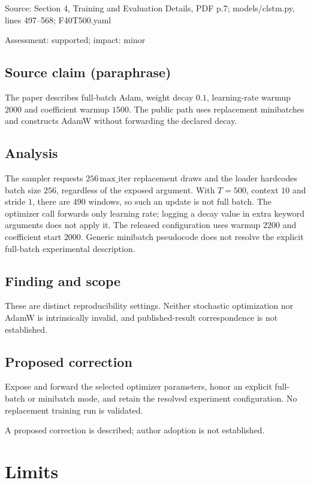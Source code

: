 \documentclass[11pt]{article}
\begin{document}
Source: Section 4, Training and Evaluation Details, PDF p.7; models/clstm.py, lines 497–568; F40T500.yaml

Assessment: supported; impact: minor

\subsection*{Source claim (paraphrase)}

The paper describes full-batch Adam, weight decay \(0.1\), learning-rate warmup \(2000\) and coefficient warmup \(1500\). The public path uses replacement minibatches and constructs AdamW without forwarding the declared decay.

\subsection*{Analysis}

The sampler requests \(256\,\mathrm{max\_iter}\) replacement draws and the loader hardcodes batch size \(256\), regardless of the exposed argument. With \(T=500\), context \(10\) and stride \(1\), there are \(490\) windows, so such an update is not full batch. The optimizer call forwards only learning rate; logging a decay value in extra keyword arguments does not apply it. The released configuration uses warmup \(2200\) and coefficient start \(2000\). Generic minibatch pseudocode does not resolve the explicit full-batch experimental description.

\subsection*{Finding and scope}

These are distinct reproducibility settings. Neither stochastic optimization nor AdamW is intrinsically invalid, and published-result correspondence is not established.

\subsection*{Proposed correction}

Expose and forward the selected optimizer parameters, honor an explicit full-batch or minibatch mode, and retain the resolved experiment configuration. No replacement training run is validated.

A proposed correction is described; author adoption is not established.

\section*{Limits}
\end{document}
